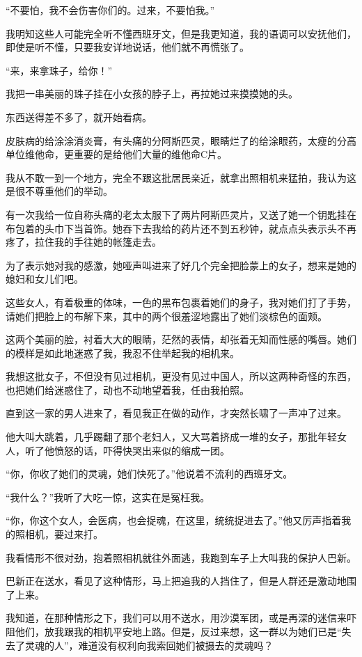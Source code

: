 \par “不要怕，我不会伤害你们的。过来，不要怕我。”
\par 我明知这些人可能完全听不懂西班牙文，但是我更知道，我的语调可以安抚他们，即使是听不懂，只要我安详地说话，他们就不再慌张了。
\par “来，来拿珠子，给你！”
\par 我把一串美丽的珠子挂在小女孩的脖子上，再拉她过来摸摸她的头。
\par 东西送得差不多了，就开始看病。
\par 皮肤病的给涂涂消炎膏，有头痛的分阿斯匹灵，眼睛烂了的给涂眼药，太瘦的分高单位维他命，更重要的是给他们大量的维他命C片。
\par 我从不敢一到一个地方，完全不跟这批居民亲近，就拿出照相机来猛拍，我认为这是很不尊重他们的举动。
\par 有一次我给一位自称头痛的老太太服下了两片阿斯匹灵片，又送了她一个钥匙挂在布包着的头巾下当首饰。她吞下去我给的药片还不到五秒钟，就点点头表示头不再疼了，拉住我的手往她的帐篷走去。
\par 为了表示她对我的感激，她哑声叫进来了好几个完全把脸蒙上的女子，想来是她的媳妇和女儿们吧。
\par 这些女人，有着极重的体味，一色的黑布包裹着她们的身子，我对她们打了手势，请她们把脸上的布解下来，其中的两个很羞涩地露出了她们淡棕色的面颊。
\par 这两个美丽的脸，衬着大大的眼睛，茫然的表情，却张着无知而性感的嘴唇。她们的模样是如此地迷惑了我，我忍不住举起我的相机来。
\par 我想这批女子，不但没有见过相机，更没有见过中国人，所以这两种奇怪的东西，也把她们给迷惑住了，动也不动地望着我，任由我拍照。
\par 直到这一家的男人进来了，看见我正在做的动作，才突然长啸了一声冲了过来。
\par 他大叫大跳着，几乎踢翻了那个老妇人，又大骂着挤成一堆的女子，那批年轻女人，听了他愤怒的话，吓得快哭出来似的缩成一团。
\par “你，你收了她们的灵魂，她们快死了。”他说着不流利的西班牙文。
\par “我什么？”我听了大吃一惊，这实在是冤枉我。
\par “你，你这个女人，会医病，也会捉魂，在这里，统统捉进去了。”他又厉声指着我的照相机，要过来打。
\par 我看情形不很对劲，抱着照相机就往外面逃，我跑到车子上大叫我的保护人巴新。
\par 巴新正在送水，看见了这种情形，马上把追我的人挡住了，但是人群还是激动地围了上来。
\par 我知道，在那种情形之下，我们可以用不送水，用沙漠军团，或是再深的迷信来吓阻他们，放我跟我的相机平安地上路。但是，反过来想，这一群以为她们已是“失去了灵魂的人”，难道没有权利向我索回她们被摄去的灵魂吗？
